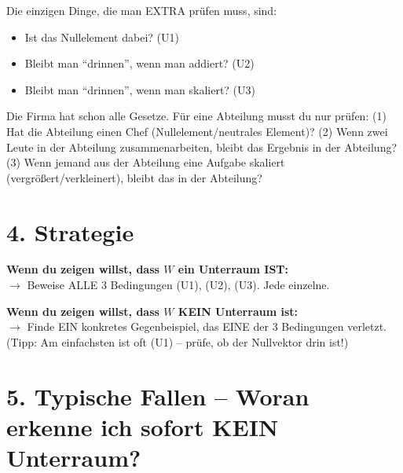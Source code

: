 \documentclass[a4paper,12pt]{article}
\begin{document}
Die einzigen Dinge, die man EXTRA pr\"ufen muss, sind:
\begin{itemize}
    \item Ist das Nullelement dabei? (U1)
    \item Bleibt man ``drinnen'', wenn man addiert? (U2)
    \item Bleibt man ``drinnen'', wenn man skaliert? (U3)
\end{itemize}

\begin{analogie}
Die Firma hat schon alle Gesetze. F\"ur eine Abteilung musst du nur pr\"ufen: (1) Hat die Abteilung einen Chef (Nullelement/neutrales Element)? (2) Wenn zwei Leute in der Abteilung zusammenarbeiten, bleibt das Ergebnis in der Abteilung? (3) Wenn jemand aus der Abteilung eine Aufgabe skaliert (vergr\"o\ss ert/verkleinert), bleibt das in der Abteilung?
\end{analogie}

\section*{4. Strategie}

\begin{merkbox}[title={Strategie-\"Ubersicht}]
\textbf{Wenn du zeigen willst, dass $W$ ein Unterraum IST:}\\
$\rightarrow$ Beweise ALLE 3 Bedingungen (U1), (U2), (U3). Jede einzelne.

\medskip
\textbf{Wenn du zeigen willst, dass $W$ KEIN Unterraum ist:}\\
$\rightarrow$ Finde EIN konkretes Gegenbeispiel, das EINE der 3 Bedingungen verletzt.\\
(Tipp: Am einfachsten ist oft (U1) -- pr\"ufe, ob der Nullvektor drin ist!)
\end{merkbox}

\section*{5. Typische Fallen -- Woran erkenne ich sofort KEIN Unterraum?}
\end{document}
